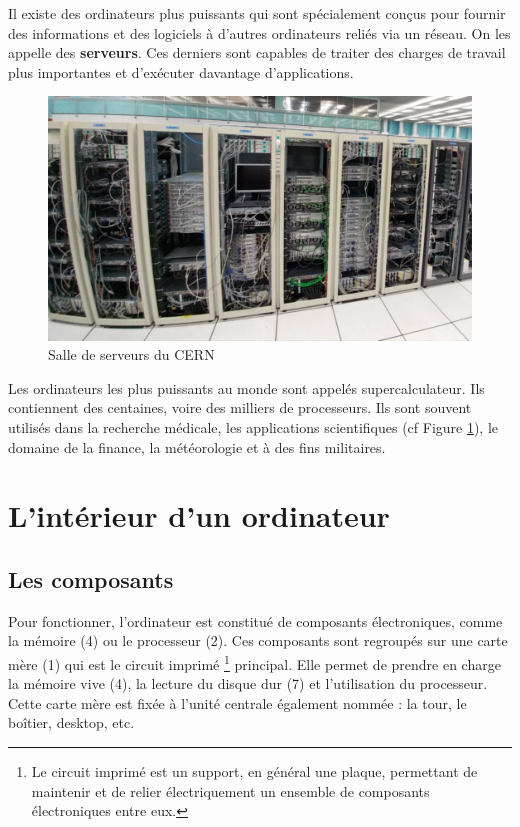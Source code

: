 \documentclass[11pt, a4paper]{book}
\begin{document}
	
	
Il existe des ordinateurs plus puissants qui sont spécialement conçus pour fournir des informations et des logiciels à d'autres ordinateurs reliés via un réseau. On les appelle des {\bf serveurs}. Ces derniers sont capables de traiter des charges de travail plus importantes et d'exécuter davantage d'applications.


\begin{figure}[h]
	\centering
	\includegraphics[scale=.4]{images/serveur}
	\caption{Salle de serveurs du CERN}
	\label{serveur}
\end{figure}


Les ordinateurs les plus puissants au monde sont appelés supercalculateur. Ils contiennent des centaines, voire des milliers de processeurs. Ils sont souvent utilisés dans la recherche médicale, les applications scientifiques (cf Figure \ref{serveur}), le domaine de la finance, la météorologie et à des fins militaires.


\section{L'intérieur d'un ordinateur}

\subsection{Les composants}

Pour fonctionner, l’ordinateur est constitué de composants électroniques, comme la mémoire (4) ou le processeur (2). Ces composants sont regroupés sur une carte mère (1) qui est le circuit imprimé \footnote{Le circuit imprimé est un support, en général une plaque, permettant de maintenir et de relier électriquement un ensemble de composants électroniques entre eux.} principal. Elle permet de prendre en charge la mémoire vive (4), la lecture du disque dur (7) et l'utilisation du processeur. Cette carte mère est fixée à l'unité centrale également nommée : la tour, le boîtier, desktop, etc.
\end{document}
